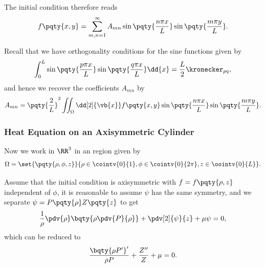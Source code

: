 {The initial condition therefore reads
\begin{equation}
    f\pqty{x, y} = \sum_{m, n = 1}^{\infty} A_{mn} \sin \pqty{\frac{n \pi x}{L}} \sin \pqty{\frac{m \pi y}{L}}.
\end{equation}

Recall that we have orthogonality conditions for the sine functions given by
\begin{equation}
    \int_{0}^{L} \sin \pqty{\frac{p \pi x}{L}} \sin \pqty{\frac{q \pi x}{L}} \dd{x} = \frac{L}{2} \kronecker_{pq},
\end{equation}
and hence we recover the coefficients \(A_{mn}\) by
\begin{equation}
    A_{mn} = \pqty{\frac{2}{L}}^2 \iint_{\Omega} \dd[2]{\vb{x}} f\pqty{x, y} \sin \pqty{\frac{n \pi x}{L}} \sin \pqty{\frac{m \pi y}{L}}.
\end{equation}

\subsubsection{Heat Equation on an Axisymmetric Cylinder}

Now we work in \(\RR^3\) in an region given by
\begin{equation}
    \Omega = \set{\pqty{\rho, \phi, z}}{\rho \in \cointv{0}{1}, \phi \in \cointv{0}{2 \pi}, z \in \oointv{0}{L}}.
\end{equation}

Assume that the initial condition is axisymmetric with \(f = f\pqty{\rho, z}\) independent of \(\phi\), it is reasonable to assume \(\psi\) has the same symmetry, and we separate \(\psi = P\pqty{\rho} Z\pqty{z}\) to get
\begin{equation}
    \frac{1}{\rho} \pdv{\rho} \bqty{\rho \pdv{P}{\rho}} + \pdv[2]{\psi}{z} + \mu \psi = 0,
\end{equation}
which can be reduced to
\begin{equation}
    \frac{\bqty{\rho P'}'}{\rho P} + \frac{Z''}{Z} + \mu = 0.
\end{equation}

}
